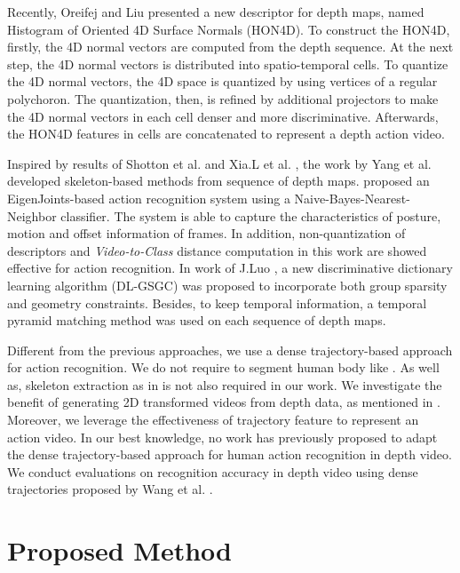 \documentclass[final,3p,times,twocolumn]{elsarticle}
\begin{document}
Recently, Oreifej and Liu \cite{oreifej2013hon4d} presented a new descriptor for depth maps, named Histogram of Oriented 4D Surface Normals (HON4D). To construct the HON4D, firstly, the 4D normal vectors are computed from the depth sequence. At the next step, the 4D normal vectors is distributed into spatio-temporal cells. To quantize the 4D normal vectors, the 4D space is quantized by using vertices of a regular polychoron. The quantization, then, is refined by additional projectors to make the 4D normal vectors in each cell denser and more discriminative. Afterwards, the HON4D features in cells are concatenated to represent a depth action video.

Inspired by results of Shotton et al. \cite{shotton2013real} and Xia.L et al. \cite{xia2011human}, the work by Yang et al. \cite{yang2012eigenjoints, luo2013group} developed skeleton-based methods from sequence of depth maps.
\cite{yang2012eigenjoints} proposed an EigenJoints-based action recognition system using a Naive-Bayes-Nearest-Neighbor classifier.
The system is able to capture the characteristics of posture, motion and offset information of frames.
In addition, non-quantization of descriptors and \textit{Video-to-Class} distance computation in this work are showed effective for action recognition.
In work of J.Luo \cite{luo2013group}, a new discriminative dictionary learning algorithm (DL-GSGC) was proposed to incorporate both group sparsity and geometry constraints.
Besides, to keep temporal information, a temporal pyramid matching method was used on each sequence of depth maps.

Different from the previous approaches, we use a dense trajectory-based approach for action recognition.
We do not require to segment human body like \cite{li2010action,yang2012recognizing}.
As well as, skeleton extraction as in \cite{yang2012eigenjoints, wang2012mining} is not also required in our work.
We investigate the benefit of generating 2D transformed videos from depth data, as mentioned in \cite{li2010action,yang2012recognizing}.
Moreover, we leverage the effectiveness of trajectory feature to represent an action video.
In our best knowledge, no work has previously proposed to adapt the dense trajectory-based approach for human action recognition in depth video.
We conduct evaluations on recognition accuracy in depth video using dense trajectories proposed by Wang et al. \cite{wang2011densetraj}.

\section{Proposed Method}
\label{lbl:ProposedMethod}
\end{document}
